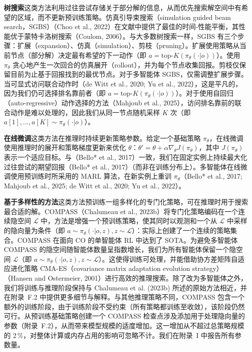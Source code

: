 \documentclass[11pt,UTF8,fontset=fandol]{ctexart}
\begin{document}
\textbf{树搜索}\quad 这类方法利用过往尝试存储关于部分解的信息，从而优先搜索解空间中有希望的区域，而不更新预训练策略。仿真引导束搜索（simulation guided beam search，SGBS）（Choo et al., 2022）在文献中提供了最佳的时间-性能平衡，其性能优于蒙特卡洛树搜索（Coulom, 2006）。与大多数树搜索一样，SGBS 有三个步骤：扩展（expansion）、仿真（simulation）、剪枝（pruning）。扩展使用策略从当前节点（部分解）决定最有希望的下一动作（即 $a = \text{top-}K(\pi_\theta(\cdot|o))$）。使用 $\pi_\theta$ 贪心地产生一次回合的仿真展开（rollout），并为每个节点收集回报。剪枝仅保留目前为止基于回报找到的最优节点。对于多智能体 SGBS，仅需调整扩展步骤。当可显式访问联合动作时（de Witt et al., 2020; Yu et al., 2022），这是平凡的，因为我们仍可选择排名靠前者（即 $a = \text{top-}K(\pi_\theta(\cdot|o))$）。对于使用自回归（auto-regressive）动作选择的方法（Mahjoub et al., 2025），访问排名靠前的联合动作是难以处理的，因此我们从同一节点随机采样 $K$ 次（即 $a[1], ..., a[K] \sim \pi_\theta(\cdot|o)$）。

\textbf{在线微调}\quad 这类方法在推理时持续更新策略参数。给定一个基础策略 $\pi_\theta$，在线微调使用推理时的展开和策略梯度更新来优化 $\theta$：$\theta' = \theta + \alpha \nabla_\theta J(\pi_\theta)$，其中 $J(\pi_\theta)$ 表示一个适应目标。与（Bello* et al., 2017）一致，我们在固定实例上持续最大化过往尝试的期望回报（Bello* et al., 2017）（而非在训练分布上）。多智能体在线微调使用预训练时所采用的 MARL 算法，在新实例上重训 $\pi_\theta$（Bello* et al., 2017; Mahjoub et al., 2025; de Witt et al., 2020; Yu et al., 2022）。

\textbf{基于多样性的方法}\quad 这类方法预训练一组多样化的专门化策略，可在推理时用于搜索最合适的解。COMPASS（Chalumeau et al., 2023b）将专门化策略编码在一个连续隐空间 $\mathcal{L}$ 中，方法是增强一个预训练策略，使其同时以观测和一个从 $\mathcal{L}$ 中采样的隐向量为条件（即 $a \sim \pi_\theta(\cdot | o, z), z \sim \mathcal{L}$）：实际上创建了一个连续的策略集合。COMPASS 在面向 CO 的单智能体 RL 中达到了 SOTA。为避免多智能体 COMPASS 的隐空间随智能体数量呈指数增长，我们为所有智能体保留一个隐空间 $\mathcal{L}$（即 $a \sim \pi_\theta(\cdot | o, z), z \sim \mathcal{L}$）。这使得训练可处理，并能借助协方差矩阵自适应进化策略 CMA-ES（covariance matrix adaptation evolution strategy）（Hansen and Ostermeier, 2001）进行高效的推理搜索。除了改为多智能体之外，我们将训练与推理阶段保持与 Chalumeau et al. (2023b) 所述的原始方法相近，并在附录~F.2 中提供更多细节与解释。与其他推理策略不同，COMPASS 包含一个额外的训练阶段，由于训练阶段不受约束（所有策略都训练至收敛），该阶段仍然可行。从预训练基础策略创建一个 COMPASS 检查点涉及添加用于处理隐向量的参数（附录~F.2），从而带来模型规模的适度增加。这一增加从不超过总策略规模的 2\,\%，对整体计算或内存占用的影响可忽略不计。我们在附录~I 中报告所有参数量。
\end{document}
